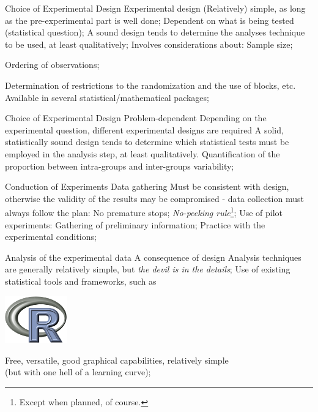 \documentclass[t]{beamer}
\begin{document}
\begin{ftst}
{Choice of Experimental Design}
{Experimental design}
\bitems (Relatively) simple, as long as the pre-experimental part is well done;
	\spitem Dependent on what is being tested (statistical question);
	\spitem A sound design tends to determine the analyses technique to be used, at least  qualitatively;
	\spitem Involves considerations about:
	\bitems Sample size;
		\item Ordering of observations;
		\item Determination of restrictions to the randomization and the use of blocks, etc.
	\eitem
	\spitem Available in several statistical/mathematical packages;
\eitem
\end{ftst}


\begin{ftst}
{Choice of Experimental Design}
{Problem-dependent}
\bitems Depending on the experimental question, different experimental designs are required
	\spitem A solid, statistically sound design tends to determine which statistical tests must be employed in the analysis step, at least qualitatively.
	\spitem Quantification of the proportion between intra-groups and inter-groups variability;
\eitem
\end{ftst}

\begin{ftst}
{Conduction of Experiments}
{Data gathering}
\bitems Must be consistent with design, otherwise the validity of the results may be compromised - data collection must always follow the plan:\vhalf
	\bitems No premature stops;	
		\spitem\textit{No-peeking rule}\footnote[1]{Except when planned, of course.};
	\eitem
	\spitem Use of pilot experiments:\vhalf
	\bitems Gathering of preliminary information;
		\spitem Practice with the experimental conditions;
	\eitem
\eitem
\end{ftst}


\begin{ftst}
{Analysis of the experimental data}
{A consequence of design}
\bitems Analysis techniques are generally relatively simple, but \textit{the devil is in the details};
	\spitem Use of existing statistical tools and frameworks, such as
\eitem
\begin{center}
\includegraphics[width=0.2\textwidth]{../figs/rlogo.png}
\end{center}
\bitems Free, versatile, good graphical capabilities, relatively simple\\
(but with one hell of a learning curve);
\eitem
\end{ftst}
\end{document}
